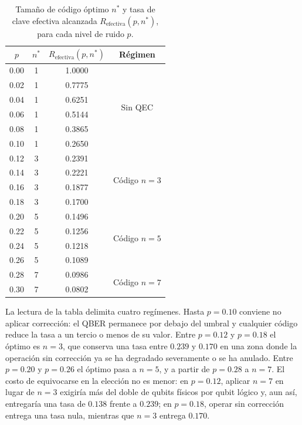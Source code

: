 \documentclass[12pt]{report}
\begin{document}
\begin{table}[H]
\centering
\caption{Tamaño de código óptimo \(n^{*}\) y tasa de clave efectiva alcanzada
\(R_{\text{efectiva}}(p,n^{*})\), para cada nivel de ruido \(p\).}
\label{tab:optimo}
\small
\begin{tabular}{@{}cccc@{}}
\toprule
\(p\) & \(n^{*}\) & \(R_{\text{efectiva}}(p,n^{*})\) & Régimen \\
\midrule
0.00 & 1 & 1.0000 & \multirow{6}{*}{Sin QEC} \\
0.02 & 1 & 0.7775 & \\
0.04 & 1 & 0.6251 & \\
0.06 & 1 & 0.5144 & \\
0.08 & 1 & 0.3865 & \\
0.10 & 1 & 0.2650 & \\
\midrule
0.12 & 3 & 0.2391 & \multirow{4}{*}{Código \(n=3\)} \\
0.14 & 3 & 0.2221 & \\
0.16 & 3 & 0.1877 & \\
0.18 & 3 & 0.1700 & \\
\midrule
0.20 & 5 & 0.1496 & \multirow{4}{*}{Código \(n=5\)} \\
0.22 & 5 & 0.1256 & \\
0.24 & 5 & 0.1218 & \\
0.26 & 5 & 0.1089 & \\
\midrule
0.28 & 7 & 0.0986 & \multirow{2}{*}{Código \(n=7\)} \\
0.30 & 7 & 0.0802 & \\
\bottomrule
\end{tabular}
\end{table}

La lectura de la tabla delimita cuatro regímenes. Hasta \(p=0.10\) conviene no
aplicar corrección: el QBER permanece por debajo del umbral y cualquier código
reduce la tasa a un tercio o menos de su valor. Entre \(p=0.12\) y \(p=0.18\) el
óptimo es \(n=3\), que conserva una tasa entre \(0.239\) y \(0.170\) en una zona
donde la operación sin corrección ya se ha degradado severamente o se ha anulado.
Entre \(p=0.20\) y \(p=0.26\) el óptimo pasa a \(n=5\), y a partir de \(p=0.28\) a
\(n=7\). El costo de equivocarse en la elección no es menor: en \(p=0.12\),
aplicar \(n=7\) en lugar de \(n=3\) exigiría más del doble de qubits físicos por
qubit lógico y, aun así, entregaría una tasa de \(0.138\) frente a \(0.239\);
en \(p=0.18\), operar sin corrección entrega una tasa nula, mientras que \(n=3\)
entrega \(0.170\).
\end{document}
